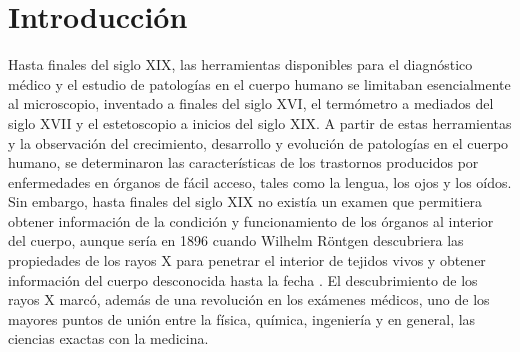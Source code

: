 \chapter{Introducción}
\label{chapter:intro}

Hasta finales del siglo XIX, las herramientas disponibles para el diagnóstico médico y el estudio de patologías en el cuerpo humano se limitaban esencialmente al microscopio, inventado a finales del siglo XVI, el termómetro a mediados del siglo XVII y el estetoscopio a inicios del siglo XIX. A partir de estas herramientas y la observación del crecimiento, desarrollo y evolución de patologías en el cuerpo humano, se determinaron las características de los trastornos producidos por enfermedades en órganos de fácil acceso, tales como la lengua, los ojos y los oídos. Sin embargo, hasta finales del siglo XIX no existía un examen que permitiera obtener información de la condición y funcionamiento de los órganos al interior del cuerpo, aunque sería en 1896 cuando Wilhelm Röntgen descubriera las propiedades de los rayos X para penetrar el interior de tejidos vivos y obtener información del cuerpo desconocida hasta la fecha \cite{Guy2005}. El descubrimiento de los rayos X marcó, además de una revolución en los exámenes médicos, uno de los mayores puntos de unión entre la física, química, ingeniería y en general, las ciencias exactas con la medicina.


